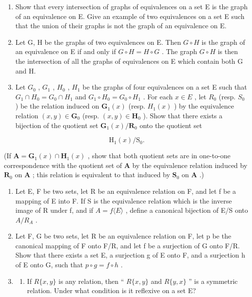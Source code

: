 \begin{enumerate}
\def\labelenumi{\arabic{enumi}.}
\setcounter{enumi}{4}
\item
  Show that every intersection of graphs of equivalences on a set E is the graph of an equivalence on E. Give an example of two equivalences on a set E such that the union of their graphs is not the graph of an equivalence on E.
\item
  Let G, H be the graphs of two equivalences on E. Then \(G \circ H\) is the graph of an equivalence on E if and only if \(G \circ H = H \circ G\) . The graph \(G \circ H\) is then the intersection of all the graphs of equivalences on E which contain both G and H.
\item
  Let \(G_{0}\) , \(G_{1}\) , \(H_{0}\) , \(H_{1}\) be the graphs of four equivalences on a set E such that \(G_{1} \cap H_{0} = G_{0} \cap H_{1}\) and \(G_{1} \circ H_{0} = G_{0} \circ H_{1}\) . For each \(x \in E\) , let \(R_{0}\) (resp. \(S_{0}\) ) be the relation induced on \(\mathbf{G}_{1}(x)\) (resp. \(H_{1}(x)\) ) by the equivalence relation \((x, y) \in \mathbf{G}_{0}\) (resp. \((x, y) \in \mathbf{H}_{0}\) ). Show that there exists a bijection of the quotient set \(\mathbf{G}_{1}(x)/\mathbf{R}_{0}\) onto the quotient set
\end{enumerate}

\[
\mathrm{H} _ {1} (x) / \mathrm{S} _ {0}.
\]

(If \(\mathbf{A} = \mathbf{G}_1(x) \cap \mathbf{H}_1(x)\) , show that both quotient sets are in one-to-one correspondence with the quotient set of \(\mathbf{A}\) by the equivalence relation induced by \(\mathbf{R}_0\) on \(\mathbf{A}\) ; this relation is equivalent to that induced by \(\mathbf{S}_0\) on \(\mathbf{A}\) .)

\begin{enumerate}
\def\labelenumi{\arabic{enumi}.}
\setcounter{enumi}{7}
\item
  Let E, F be two sets, let R be an equivalence relation on F, and let f be a mapping of E into F. If S is the equivalence relation which is the inverse image of R under f, and if \(A = f \langle E \rangle\) , define a canonical bijection of E/S onto \(A/R_{A}\) .
\item
  Let F, G be two sets, let R be an equivalence relation on F, let p be the canonical mapping of F onto F/R, and let f be a surjection of G onto F/R. Show that there exists a set E, a surjection g of E onto F, and a surjection h of E onto G, such that \(p \circ g = f \circ h\) .
\item
  \begin{enumerate}
  \def\labelenumii{(\alph{enumii})}
  \tightlist
  \item
    If \(R\{x, y\}\) is any relation, then `` \(R\{x, y\}\) and \(R\{y, x\}\) '' is a symmetric relation. Under what condition is it reflexive on a set E?
  \end{enumerate}
\end{enumerate}

